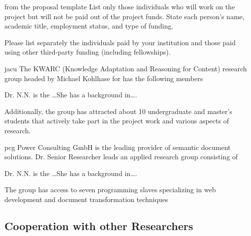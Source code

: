 \begin{todo}{from the proposal template}
  List only those individuals who will work on the project but will not be paid out of the
  project funds. State each person’s name, academic title, employment status, and type of
  funding.

  Please list separately the individuals paid by your institution and those paid using
  other third-party funding (including fellowships).
\end{todo}

\begin{sitedescription}{jacu}
  The KWARC (Knowledge Adaptation and Reasoning for Content) research group headed by
  Michael Kohlhase for has the following members
  \begin{compactdesc}
  \item[Dr. N.N.] is the \ldots She has a background in\ldots.
  \end{compactdesc}
  Additionally, the group has attracted about 10 undergraduate and master's students that
  actively take part in the project work and various aspects of research.
\end{sitedescription}

\begin{sitedescription}{pcg}
  Power Consulting GmbH is the leading provider of semantic document solutions. Dr. Senior
  Researcher leads an applied research group consisting of
  \begin{compactdesc}
  \item[Dr. N.N.] is the \ldots She has a background in\ldots.
  \end{compactdesc}
  The group has access to seven programming slaves specializing in web development and
  document transformation techniques
\end{sitedescription}


\subsection{Cooperation with other Researchers}\label{sec:coop}

